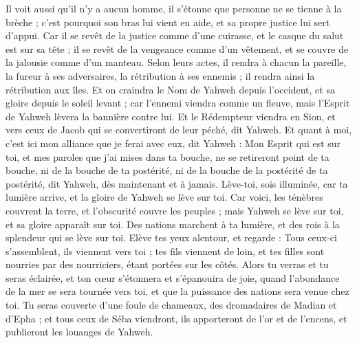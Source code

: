 \begin{multicols}{2}
Il voit aussi qu'il n'y a aucun homme, il s'étonne que personne ne se tienne à la brèche ; c'est pourquoi son bras lui vient en aide, et sa propre justice lui sert d'appui.
Car il se revêt de la justice comme d'une cuirasse, et le casque du salut est sur sa tête ; il se revêt de la vengeance comme d'un vêtement, et se couvre de la jalousie comme d'un manteau.
Selon leurs actes, il rendra à chacun la pareille, la fureur à ses adversaires, la rétribution à ses ennemis ; il rendra ainsi la rétribution aux îles.
Et on craindra le Nom de Yahweh depuis l'occident, et sa gloire depuis le soleil levant ; car l'ennemi viendra comme un fleuve, mais l'Esprit de Yahweh lèvera la bannière contre lui.
Et le Rédempteur viendra en Sion, et vers ceux de Jacob qui se convertiront de leur péché, dit Yahweh.
Et quant à moi, c'est ici mon alliance que je ferai avec eux, dit Yahweh : Mon Esprit qui est sur toi, et mes paroles que j'ai mises dans ta bouche, ne se retireront point de ta bouche, ni de la bouche de ta postérité, ni de la bouche de la postérité de ta postérité, dit Yahweh, dès maintenant et à jamais.
\VerseOne{}Lève-toi, sois illuminée, car ta lumière arrive, et la gloire de Yahweh se lève sur toi.
Car voici, les ténèbres couvrent la terre, et l'obscurité couvre les peuples ; mais Yahweh se lève sur toi, et sa gloire apparaît sur toi.
Des nations marchent à ta lumière, et des rois à la splendeur qui se lève sur toi.
Elève tes yeux alentour, et regarde : Tous ceux-ci s'assemblent, ils viennent vers toi ; tes fils viennent de loin, et tes filles sont nourries par des nourriciers, étant portées sur les côtés.
Alors tu verras et tu seras éclairée, et ton cœur s'étonnera et s'épanouira de joie, quand l'abondance de la mer se sera tournée vers toi, et que la puissance des nations sera venue chez toi.
Tu seras couverte d'une foule de chameaux, des dromadaires de Madian et d'Epha ; et tous ceux de Séba viendront, ils apporteront de l'or et de l'encens, et publieront les louanges de Yahweh.

\end{multicols}
